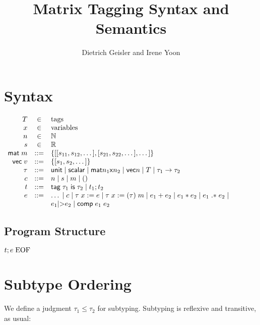 \documentclass{article}
\begin{document}
\newcommand{\mat}{\mathsf{mat}n_1\textnormal{x}n_2}
\newcommand{\env}[1]{\langle#1,\sigma\rangle}

\mathlig{->}{\rightarrow}
\mathlig{|-}{\vdash}
\mathlig{=>}{\Rightarrow}
\mathligson

\title{Matrix Tagging Syntax and Semantics}
\author{Dietrich Geisler and Irene Yoon}

\section{Syntax}

$\begin{array}{rcl}
T &\in& \text{tags} \\
x &\in& \text{variables} \\
n &\in& \mathbb{N} \\
s &\in& \mathbb{R}\\
\mathsf{mat}\;m&::=&\{[[s_{11},s_{12},\dots],[s_{21},s_{22},\dots],\dots]\}\\
\mathsf{vec}\;v&::=&\{[s_1,s_2,\dots]\}\\
\tau&::=&\mathsf{unit}\;|\;\mathsf{scalar}\;|\;\mathsf{mat}n_1\mathsf{x}n_2\;|\;\mathsf{vec}n\;|\;T\;|\;\tau_1->\tau_2\\
c&::=&n\;|\;s\;|\;m \;|\; ()\\
t&::=&\mathsf{tag}\;\tau_1\;\mathsf{is}\;\tau_2\;|\;t_1;t_2\\
e&::=&\dots\;|\;c\;|\;\tau\;x:=e\;|\;\tau\;x:=(\tau)\;m\;|\;e_1+e_2\;|\;e_1*e_2\;|\;e_1\;\mathsf{.*}\;e_2\;|\\
&&e_1\textnormal{|>}e_2\;|\;\mathsf{comp}\;e_1\;e_2
\end{array}$

\subsection{Program Structure}
$t;e\;\textnormal{EOF}$\\

\section{Subtype Ordering}

We define a judgment $\tau_1 \leq \tau_2$ for subtyping.
Subtyping is reflexive and transitive, as usual:
\end{document}
